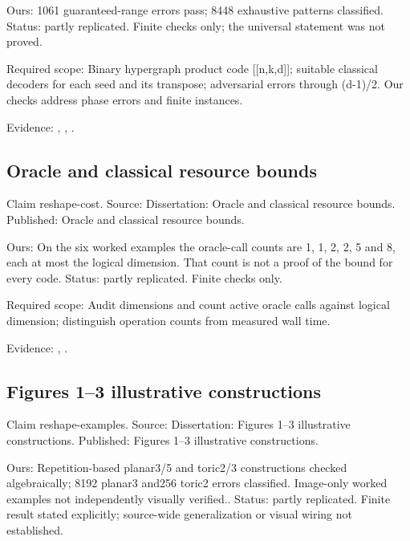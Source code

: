 Ours: 1061 guaranteed-range errors pass; 8448 exhaustive patterns classified. Status: partly replicated. Finite checks only; the universal statement was not proved.

Required scope: Binary hypergraph product code [[n,k,d]]; suitable classical decoders for each seed and its transpose; adversarial errors through (d-1)/2. Our checks address phase errors and finite instances.

Evidence: \href{https://github.com/alectionary/vibe-math/blob/master/formalization/quintavalle-hgp/sources/browser-extraction.txt}{}, \href{https://github.com/alectionary/vibe-math/blob/master/formalization/quintavalle-hgp/availability.md}{}, \href{https://github.com/alectionary/vibe-math/blob/master/formalization/quintavalle-hgp/results/exact_checks.json}{}.
\subsection{Oracle and classical resource bounds}\label{claim:reshape-cost}
Claim reshape-cost. Source: Dissertation: Oracle and classical resource bounds. Published: Oracle and classical resource bounds.

Ours: On the six worked examples the oracle-call counts are 1, 1, 2, 2, 5 and 8, each at most the logical dimension. That count is not a proof of the bound for every code. Status: partly replicated. Finite checks only.

Required scope: Audit dimensions and count active oracle calls against logical dimension; distinguish operation counts from measured wall time.

Evidence: \href{https://github.com/alectionary/vibe-math/blob/master/formalization/quintavalle-hgp/sources/browser-extraction.txt}{}, \href{https://github.com/alectionary/vibe-math/blob/master/formalization/quintavalle-hgp/availability.md}{}.
\subsection{Figures 1--3 illustrative constructions}\label{claim:reshape-examples}
Claim reshape-examples. Source: Dissertation: Figures 1--3 illustrative constructions. Published: Figures 1--3 illustrative constructions.

Ours: Repetition-based planar3/5 and toric2/3 constructions checked algebraically; 8192 planar3 and256 toric2 errors classified. Image-only worked examples not independently visually verified.. Status: partly replicated. Finite result stated explicitly; source-wide generalization or visual wiring not established.

